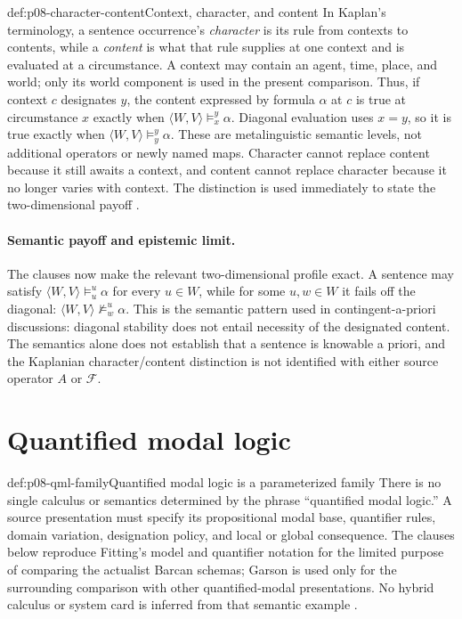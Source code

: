 \begin{hbdefinition}{def:p08-character-content}{Context, character, and content}
In Kaplan's terminology, a sentence occurrence's \emph{character} is its rule
from contexts to contents, while a \emph{content} is what that rule supplies at
one context and is evaluated at a circumstance.  A context may contain an
agent, time, place, and world; only its world component is used in the present
comparison.  Thus, if context \(c\) designates \(y\), the content expressed by
formula \(\alpha\) at \(c\) is true at circumstance \(x\) exactly when
\(\langle W,V\rangle\models_x^y\alpha\).  Diagonal evaluation uses \(x=y\),
so it is true exactly when
\(\langle W,V\rangle\models_y^y\alpha\).  These are metalinguistic semantic
levels, not additional operators or newly named maps.  Character cannot replace
content because it still awaits a context, and content cannot replace character
because it no longer varies with context.  The distinction is used immediately
to state the two-dimensional payoff \cite{Kaplan1989}.
\end{hbdefinition}

\paragraph{Semantic payoff and epistemic limit.}
The clauses now make the relevant two-dimensional profile exact.  A sentence
may satisfy \(\langle W,V\rangle\models_u^u\alpha\) for every \(u\in W\),
while for some \(u,w\in W\) it fails off the diagonal:
\(\langle W,V\rangle\not\models_w^u\alpha\).  This is the
semantic pattern used in contingent-a-priori discussions: diagonal stability
does not entail necessity of the designated content.  The semantics alone does
not establish that a sentence is knowable a priori, and the Kaplanian
character/content distinction is not identified with either source operator
\(A\) or \(\mathcal F\).

\section{Quantified modal logic}

\begin{hbwarning}{def:p08-qml-family}{Quantified modal logic is a parameterized family}
There is no single calculus or semantics determined by the phrase
``quantified modal logic.''  A source presentation must specify its
propositional modal base, quantifier rules, domain variation, designation
policy, and local or global consequence.  The clauses below reproduce
Fitting's model and quantifier notation for the limited purpose of comparing
the actualist Barcan schemas; Garson is used only for the surrounding
comparison with other quantified-modal presentations.  No hybrid calculus or
system card is inferred from that semantic example
\cite{Fitting2002Alethic,FittingMendelsohn1998,Garson2001}.
\end{hbwarning}

